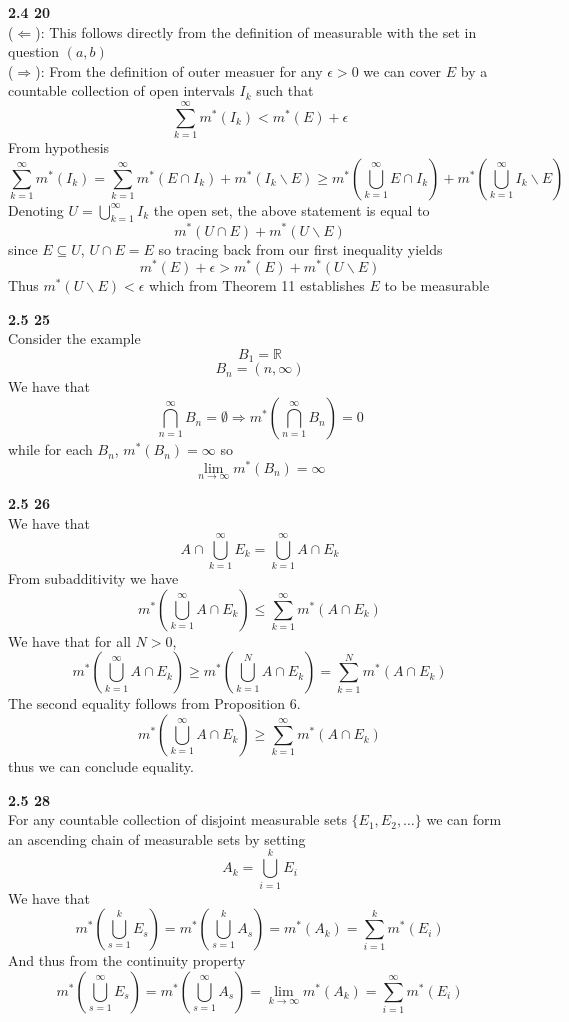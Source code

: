 \documentclass[12pt]{article}
\newenvironment{ques}[1]{\textbf{#1}\vspace{1 mm}\\ }{\bigskip}
\theoremstyle{definition}
\renewcommand{\l}{\left }
\renewcommand{\r}{\right }
\newcommand{\R}{\mathbb R}
\renewcommand{\-}{\backslash}
\begin{document}
\begin{ques}{2.4 20}
	($\Leftarrow$): This follows directly from the definition of measurable
	with the set in question $(a,b)$\\
	($\Rightarrow$): From the definition of outer measuer for any $\epsilon >
	0$ we can cover $E$ by a countable collection of open intervals $I_k$ such that
	$$\sum_{k=1}^\infty m^*(I_k) < m^*(E) + \epsilon$$
	From hypothesis
	$$\sum_{k=1}^\infty m^*(I_k) = \sum_{k=1}^\infty m^*(E \cap I_k) + m^*(I_k
	\backslash E) \geq m^*\l(\bigcup_{k=1}^\infty E \cap I_k \r) +
	m^*\l(\bigcup_{k=1}^\infty I_k \backslash E \r)$$
	Denoting $U = \bigcup_{k=1}^\infty I_k$ the open set, the above statement
	is equal to 
	$$m^*(U \cap E) + m^*(U \backslash E)$$
	since $E \subseteq U$, $U \cap E = E$ so tracing back from our first
	inequality yields
	$$m^*(E) + \epsilon > m^*(E) + m^*(U \backslash E)$$
	Thus $m^*(U \backslash E) < \epsilon$ which from Theorem 11 establishes $E$
	to be measurable
\end{ques}

\begin{ques}{2.5 25}
	Consider the example 
	$$B_1 = \R$$
	$$B_n = (n, \infty)$$
	We have that
	$$\bigcap_{n=1}^\infty B_n = \emptyset \Rightarrow
	m^*\l(\bigcap_{n=1}^\infty B_n\r) = 0$$
	while for each $B_n$, $m^*(B_n) = \infty$ so
	$$\lim_{n \to \infty} m^*(B_n) = \infty$$
\end{ques}

\begin{ques}{2.5 26}
	We have that 
	$$A \cap  \bigcup_{k=1}^\infty E_k = \bigcup_{k=1}^\infty A \cap E_k$$
	From subadditivity we have
	$$m^*\l(\bigcup_{k=1}^\infty A \cap E_k\r) \leq \sum_{k=1}^\infty m^*(A
	\cap E_k)$$
	We have that for all $N > 0$,
	$$m^*\l(\bigcup_{k=1}^\infty A \cap E_k\r) \geq m^*\l(\bigcup_{k=1}^N A
	\cap E_k \r) = \sum_{k=1}^N m^*(A \cap E_k)$$
	The second equality follows from Proposition 6.
	$$m^*\l(\bigcup_{k=1}^\infty A \cap E_k\r) \geq \sum_{k=1}^\infty m^*(A
	\cap E_k)$$
	thus we can conclude equality.\\
\end{ques}

\begin{ques}{2.5 28}
	For any countable collection of disjoint measurable sets $\{E_1, E_2, \dots\}$ 
	we can form an ascending chain of measurable sets by setting 
	$$A_k = \bigcup_{i=1}^k E_i$$
	We have that
	$$m^*\l(\bigcup_{s =1}^k E_s\r) = m^*\l(\bigcup_{s =1}^k A_s\r) = m^*(A_k)
	= \sum_{i=1}^k m^*(E_i)$$
	And thus from the continuity property
	$$m^*\l(\bigcup_{s =1}^\infty E_s\r) = m^*\l(\bigcup_{s =1}^\infty A_s\r) =
	\lim_{k \to \infty} m^*(A_k) = \sum_{i=1}^\infty m^*(E_i)$$
\end{ques}
\end{document}
